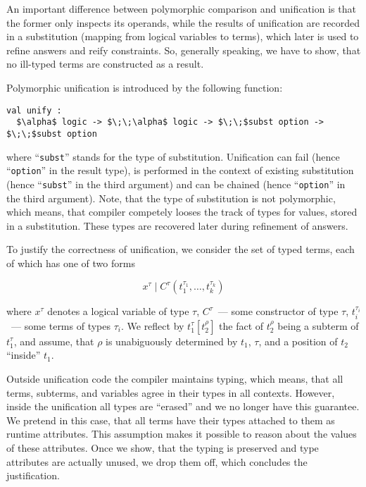 \documentclass[10pt, oneside, nocopyrightspace]{sigplanconf}
\begin{document}
An important difference between polymorphic comparison and unification is that the former 
only inspects its operands, while the results of unification are recorded in a substitution
(mapping from logical variables to terms), which later is used to refine answers and reify 
constraints. So, generally speaking, we have to show, that no ill-typed terms are constructed 
as a result.

Polymorphic unification is introduced by the following function:

\begin{lstlisting}[mathescape=true]
val unify : 
  $\alpha$ logic -> $\;\;\alpha$ logic -> $\;\;$subst option -> $\;\;$subst option
\end{lstlisting}

\noindent where ``\lstinline{subst}'' stands for the type of substitution. Unification can 
fail (hence ``\lstinline{option}'' in the result type), is performed in the context of
existing substitution (hence ``\lstinline{subst}'' in the third argument) and
can be chained (hence ``\lstinline{option}'' in the third argument). Note, that the 
type of substitution is not polymorphic, which means, that compiler competely looses the 
track of types for values, stored in a substitution. These types are recovered later during
refinement of answers.

To justify the correctness of unification, we consider the set of typed terms, each of which
has one of two forms

$$
x^\tau \mid C^\tau(t_1^{\tau_1},\dots,t_k^{\tau_k})
$$

\noindent where $x^\tau$ denotes a logical variable of type $\tau$, 
$C^\tau$~--- some constructor of type $\tau$, $t_i^{\tau_i}$~--- some terms of types $\tau_i$.
We reflect by $t_1^\tau[t_2^\rho]$ the fact of $t_2^\rho$ being a subterm of $t_1^\tau$, and
assume, that $\rho$ is unabiguously determined by $t_1$, $\tau$, and a position of $t_2$ 
``inside'' $t_1$.

Outside unification code the compiler maintains typing, which means, that all 
terms, subterms, and variables agree in their types in all contexts. However, inside
the unification all types are ``erased'' and we no longer have this guarantee. 
We pretend in this case, that all terms have their types attached to them as runtime attributes. 
This assumption makes it possible to reason about the values of these attributes. Once we show, 
that the typing is preserved and type attributes are actually unused, we drop them off, 
which concludes the justification.
\end{document}
